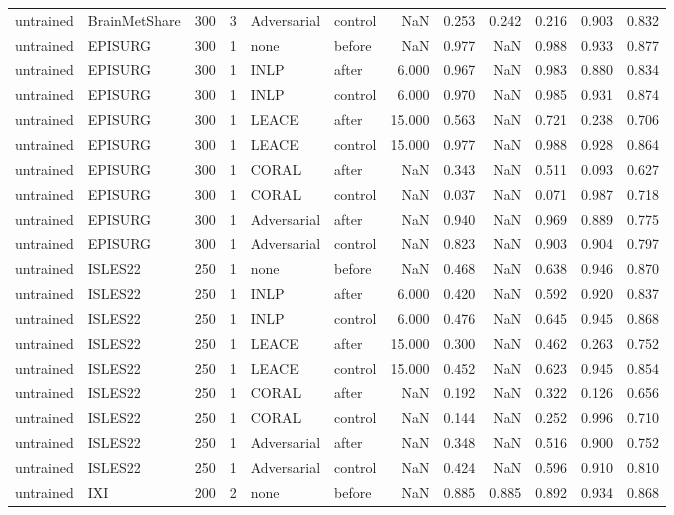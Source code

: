 \begin{tabular}{llrrllrrrrrr}
untrained & BrainMetShare & 300 & 3 & Adversarial & control & NaN & 0.253 & 0.242 & 0.216 & 0.903 & 0.832 \\
untrained & EPISURG & 300 & 1 & none & before & NaN & 0.977 & NaN & 0.988 & 0.933 & 0.877 \\
untrained & EPISURG & 300 & 1 & INLP & after & 6.000 & 0.967 & NaN & 0.983 & 0.880 & 0.834 \\
untrained & EPISURG & 300 & 1 & INLP & control & 6.000 & 0.970 & NaN & 0.985 & 0.931 & 0.874 \\
untrained & EPISURG & 300 & 1 & LEACE & after & 15.000 & 0.563 & NaN & 0.721 & 0.238 & 0.706 \\
untrained & EPISURG & 300 & 1 & LEACE & control & 15.000 & 0.977 & NaN & 0.988 & 0.928 & 0.864 \\
untrained & EPISURG & 300 & 1 & CORAL & after & NaN & 0.343 & NaN & 0.511 & 0.093 & 0.627 \\
untrained & EPISURG & 300 & 1 & CORAL & control & NaN & 0.037 & NaN & 0.071 & 0.987 & 0.718 \\
untrained & EPISURG & 300 & 1 & Adversarial & after & NaN & 0.940 & NaN & 0.969 & 0.889 & 0.775 \\
untrained & EPISURG & 300 & 1 & Adversarial & control & NaN & 0.823 & NaN & 0.903 & 0.904 & 0.797 \\
untrained & ISLES22 & 250 & 1 & none & before & NaN & 0.468 & NaN & 0.638 & 0.946 & 0.870 \\
untrained & ISLES22 & 250 & 1 & INLP & after & 6.000 & 0.420 & NaN & 0.592 & 0.920 & 0.837 \\
untrained & ISLES22 & 250 & 1 & INLP & control & 6.000 & 0.476 & NaN & 0.645 & 0.945 & 0.868 \\
untrained & ISLES22 & 250 & 1 & LEACE & after & 15.000 & 0.300 & NaN & 0.462 & 0.263 & 0.752 \\
untrained & ISLES22 & 250 & 1 & LEACE & control & 15.000 & 0.452 & NaN & 0.623 & 0.945 & 0.854 \\
untrained & ISLES22 & 250 & 1 & CORAL & after & NaN & 0.192 & NaN & 0.322 & 0.126 & 0.656 \\
untrained & ISLES22 & 250 & 1 & CORAL & control & NaN & 0.144 & NaN & 0.252 & 0.996 & 0.710 \\
untrained & ISLES22 & 250 & 1 & Adversarial & after & NaN & 0.348 & NaN & 0.516 & 0.900 & 0.752 \\
untrained & ISLES22 & 250 & 1 & Adversarial & control & NaN & 0.424 & NaN & 0.596 & 0.910 & 0.810 \\
untrained & IXI & 200 & 2 & none & before & NaN & 0.885 & 0.885 & 0.892 & 0.934 & 0.868 \\

\end{tabular}
